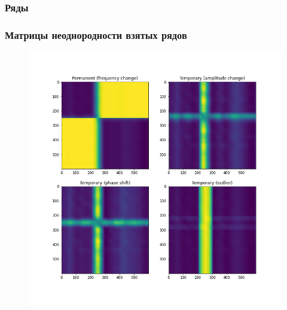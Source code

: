 \documentclass[11pt]{beamer}
\begin{document}
	\begin{frame}
		\frametitle{Ряды}
		\begin{figure}[h]
		\end{figure}
	
	\end{frame}

	\begin{frame}
		\frametitle{Матрицы неоднородности взятых рядов}
		\begin{figure}[b]
			\centering
			\includegraphics[width=0.75\linewidth]{imgs/heterogeneity_types_noised}
		\end{figure}
		
	\end{frame}
\end{document}
